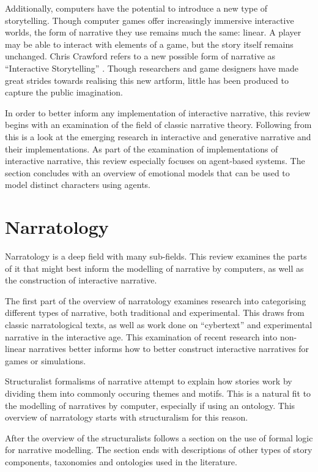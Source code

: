\documentclass[11pt]{report}
\begin{document}
Additionally, computers have the potential to introduce a new type of storytelling. Though computer games offer increasingly immersive interactive worlds, the form of narrative they use remains much the same: linear. A player may be able to interact with elements of a game, but the story itself remains unchanged.
Chris Crawford refers to a new possible form of narrative as ``Interactive Storytelling'' \citep{crawford2012chris}. Though researchers and game designers have made great strides towards realising this new artform, little has been produced to capture the public imagination.

In order to better inform any implementation of interactive narrative, this
review begins with an examination of the field of classic narrative theory. Following from this is a look at the emerging research in interactive and generative narrative and their implementations.
As part of the examination of implementations of interactive narrative, this review especially focuses on agent-based systems. The section concludes with an overview of emotional models that can be used to model distinct characters using agents.

\section{Narratology}
\label{sec:narratology}
Narratology is a deep field with many sub-fields. This review examines the parts of it that might best inform the modelling of narrative by computers, as well as the construction of interactive narrative.

The first part of the overview of narratology examines research into
categorising different types of narrative, both traditional and experimental.
This draws from classic narratological texts, as well as work done on
``cybertext'' and experimental narrative in the interactive age. This
examination of recent research into non-linear narratives better informs how to better construct interactive narratives for games or simulations.

Structuralist formalisms of narrative attempt to explain how stories work by
dividing them into commonly occuring themes and motifs. This is a natural fit to
the modelling of narratives by computer, especially if using an ontology. This
overview of narratology starts with structuralism for this reason.

After the overview of the structuralists follows a section on the use of formal
logic for narrative modelling. The section ends with descriptions of other types
of story components, taxonomies and ontologies used in the literature.
\end{document}
